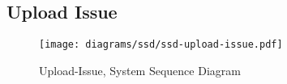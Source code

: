 \subsection{Upload Issue}
\label{subsec:upload-issue}
\begin{figure}[H]
    \texttt{[image: diagrams/ssd/ssd-upload-issue.pdf]}
    \caption{Upload-Issue, System Sequence Diagram}
    \label{fig:upload-issue-ssd}
\end{figure}
\newpage

